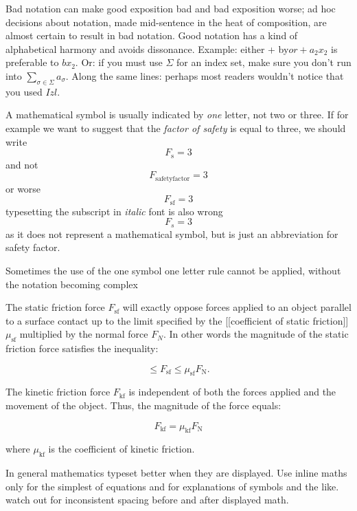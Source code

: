 {

Bad notation can make good exposition bad and bad exposition worse; ad hoc decisions about notation, made mid-sentence in the heat of composition, are almost certain to result in bad notation. Good notation has a kind of alphabetical harmony and avoids dissonance. Example: either + by$ or +a_2x_2$ is preferable to $bx_2$. Or: if you must use $\Sigma$ for an index set, make sure you don't run into $\sum_{\sigma \in \Sigma}a_\sigma$. Along the same lines: perhaps most readers wouldn't notice that you used $Izl$.


A mathematical symbol is usually indicated by \emph{one} letter, not two or three. If for example we want to suggest that the \textit{factor of safety} is equal to three, we should write
\[F_{\mathrm{s}}=3\]
and not
\[F_{\mathrm{safetyfactor}}=3\]
or worse
\[F_{\mathrm{sf}}=3\]
typesetting the subscript in \textit{italic} font is also wrong
\[F_{s}=3\]
as it does not represent a mathematical symbol, but is just an abbreviation for safety factor.

Sometimes the use of the one symbol one letter rule cannot be applied, without the notation becoming complex
\medskip

{
\narrower\narrower
The static friction force \(F_{\mathrm{sf}}\) will exactly oppose forces applied to an object parallel to a surface contact up to the limit specified by the [[coefficient of static friction]] \(\mu_{\mathrm{sf}}\) multiplied by the normal force \(F_N\). In other words the magnitude of the static friction force satisfies the inequality:

\[ \le F_{\mathrm{sf}} \le \mu_{\mathrm{sf}} F_\mathrm{N}. \]

The kinetic friction force \(F_{\mathrm{kf}}\) is independent of both the forces applied and the movement of the object. Thus, the magnitude of the force equals:

\[F_{\mathrm{kf}} = \mu_{\mathrm{kf}} F_\mathrm{N}\]

where \(\mu_{\mathrm{kf}}\) is the coefficient of kinetic friction.
}






In general mathematics typeset better when they are displayed. Use inline maths only for the simplest of equations and for explanations of symbols and the like. watch out for inconsistent spacing before and after displayed math.

}
